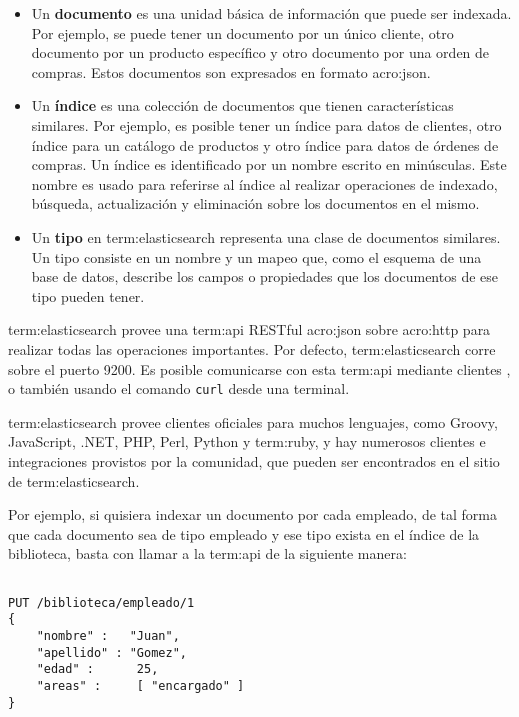 \begin{itemize}

\item
Un \textbf{documento} es una unidad básica de información que puede ser indexada. Por
ejemplo, se puede tener un documento por un único cliente, otro documento por
un producto específico y otro documento por una orden de compras. Estos
documentos son expresados en formato \gls{acro:json}.

\item
Un \textbf{índice} es una colección de documentos que tienen características similares.
Por ejemplo, es posible tener un índice para datos de clientes, otro índice para
un catálogo de productos y otro índice para datos de órdenes de compras. Un
índice es identificado por un nombre escrito en minúsculas. Este nombre es usado
para referirse al índice al realizar operaciones de indexado, búsqueda,
actualización y eliminación sobre los documentos en el mismo.

\item
Un \textbf{tipo} en \gls{term:elasticsearch} representa una clase de documentos
similares. Un tipo consiste en un nombre y un mapeo que, como el esquema de una
base de datos, describe los campos o propiedades que los documentos de ese tipo
pueden tener.

\end{itemize}

\gls{term:elasticsearch} provee una \gls{term:api} RESTful \gls{acro:json} sobre
\gls{acro:http} para realizar todas las operaciones importantes. Por defecto,
\gls{term:elasticsearch} corre sobre el puerto 9200. Es posible comunicarse con
esta \gls{term:api} mediante clientes , o también usando el comando
\texttt{curl} desde una terminal.

\gls{term:elasticsearch} provee clientes oficiales para muchos lenguajes, como
Groovy, JavaScript, .NET, PHP, Perl, Python y \gls{term:ruby}, y hay numerosos
clientes e integraciones provistos por la comunidad, que pueden ser encontrados
en el sitio  de \gls{term:elasticsearch}.

Por ejemplo, si quisiera indexar un documento por cada empleado, de tal forma
que cada documento sea de tipo empleado y ese tipo exista en el índice de la
biblioteca, basta con llamar a la \gls{term:api} de la siguiente manera:

\begin{lstlisting}

PUT /biblioteca/empleado/1
{
    "nombre" :   "Juan",
    "apellido" : "Gomez",
    "edad" :      25,
    "areas" :     [ "encargado" ]
}

\end{lstlisting}

